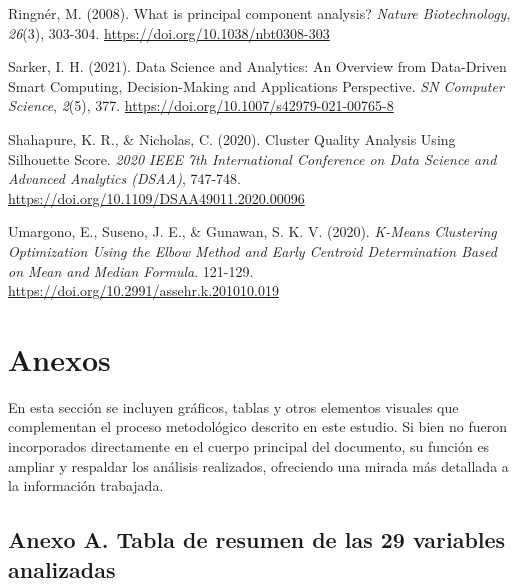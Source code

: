 \documentclass[
  12pt,
  letterpaper,
]{article}
\newlength{\cslhangindent}
\newenvironment{CSLReferences}[2] %
 {\begin{list}{}{%
  \setlength{\itemindent}{0pt}
  \setlength{\leftmargin}{0pt}
  \setlength{\parsep}{0pt}
  \ifodd #1
   \setlength{\leftmargin}{\cslhangindent}
   \setlength{\itemindent}{-1\cslhangindent}
  \fi
  \setlength{\itemsep}{#2\baselineskip}}}
 {\end{list}}
\begin{document}
\begin{CSLReferences}{1}{0}
Ringnér, M. (2008). What is principal component analysis? \emph{Nature Biotechnology}, \emph{26}(3), 303-304. \url{https://doi.org/10.1038/nbt0308-303}

Sarker, I. H. (2021). Data {Science} and {Analytics}: {An} {Overview} from {Data}-{Driven} {Smart} {Computing}, {Decision}-{Making} and {Applications} {Perspective}. \emph{SN Computer Science}, \emph{2}(5), 377. \url{https://doi.org/10.1007/s42979-021-00765-8}

Shahapure, K. R., \& Nicholas, C. (2020). Cluster {Quality} {Analysis} {Using} {Silhouette} {Score}. \emph{2020 {IEEE} 7th {International} {Conference} on {Data} {Science} and {Advanced} {Analytics} ({DSAA})}, 747-748. \url{https://doi.org/10.1109/DSAA49011.2020.00096}

Umargono, E., Suseno, J. E., \& Gunawan, S. K. V. (2020). \emph{K-{Means} {Clustering} {Optimization} {Using} the {Elbow} {Method} and {Early} {Centroid} {Determination} {Based} on {Mean} and {Median} {Formula}}. 121-129. \url{https://doi.org/10.2991/assehr.k.201010.019}

\end{CSLReferences}

\newpage

\section{Anexos}\label{anexos}

En esta sección se incluyen gráficos, tablas y otros elementos visuales que complementan el proceso metodológico descrito en este estudio.
Si bien no fueron incorporados directamente en el cuerpo principal del documento, su función es ampliar y respaldar los análisis realizados, ofreciendo una mirada más detallada a la información trabajada.

\subsection{Anexo A. Tabla de resumen de las 29 variables analizadas}\label{anexo-a.-tabla-de-resumen-de-las-29-variables-analizadas}
\end{document}
